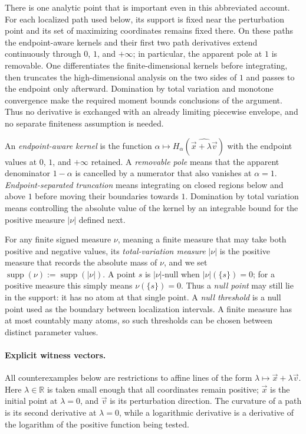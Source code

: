 \documentclass[aps,pra,11pt,onecolumn,nofootinbib,tightenlines]{revtex4-2}
\theoremstyle{definition}
\newcommand{\R}{\mathbb{R}}
\begin{document}
There is one analytic point that is important even in this abbreviated account.
For each localized path used below, its support is fixed near the perturbation
point and its set of maximizing coordinates remains fixed there.  On these paths the
endpoint-aware kernels and their first two path derivatives extend continuously
through $0$, $1$, and $+\infty$; in particular, the apparent pole at $1$ is
removable.  One differentiates the finite-dimensional kernels before integrating,
then truncates the high-dimensional analysis on the two sides of $1$ and passes
to the endpoint only afterward.  Domination by total variation and monotone
convergence make the required moment bounds conclusions of the argument.  Thus
no derivative is exchanged with an already limiting piecewise envelope, and no
separate finiteness assumption is needed.

An \emph{endpoint-aware kernel} is the function
$\alpha\mapsto H_\alpha(\widehat{\vec{x}+\lambda\vec{v}})$ with the endpoint
values at $0$, $1$, and $+\infty$ retained.  A \emph{removable pole} means
that the apparent denominator $1-\alpha$ is cancelled by a numerator that
also vanishes at $\alpha=1$.  \emph{Endpoint-separated truncation} means
integrating on closed regions below and above $1$ before moving their
boundaries towards $1$.  Domination by total variation means controlling the
absolute value of the kernel by an integrable bound for the positive measure
$|\nu|$ defined next.

For any finite signed measure $\nu$, meaning a finite measure that may take
both positive and negative values, its \emph{total-variation measure}
$|\nu|$ is the positive measure that records the absolute mass of $\nu$, and
we set $\operatorname{supp}(\nu):=\operatorname{supp}(|\nu|)$.  A point $s$
is $|\nu|$-null when $|\nu|(\{s\})=0$; for a positive measure this simply
means $\nu(\{s\})=0$.  Thus a \emph{null point} may still lie in the support:
it has no atom at that single point.  A \emph{null threshold} is a null point
used as the boundary between localization intervals.  A finite measure has at
most countably many atoms, so such thresholds can be chosen between distinct
parameter values.

\paragraph{Explicit witness vectors.}
All counterexamples below are restrictions to affine lines of the form
$\lambda\mapsto\vec{x}+\lambda\vec{v}$.  Here $\lambda\in\R$ is taken small
enough that all coordinates remain positive; $\vec{x}$ is the initial point
at $\lambda=0$, and $\vec{v}$ is its perturbation direction.  The curvature
of a path is its second derivative at $\lambda=0$, while a logarithmic
derivative is a derivative of the logarithm of the positive function being
tested.
\end{document}
